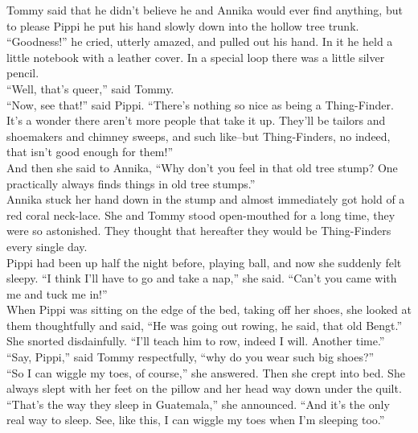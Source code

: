 \documentclass{standard}
\begin{document}
Tommy said that he didn’t believe he and Annika would ever find anything, but to please Pippi he put his hand slowly down into the hollow tree trunk.\\

``Goodness!” he cried, utterly amazed, and pulled out his hand. In it he held a little notebook with a leather cover. In a special loop there was a little silver pencil.\\

``Well, that’s queer,” said Tommy.\\

``Now, see that!” said Pippi. ``There’s nothing so nice as being a Thing-Finder. It’s a wonder there aren’t more people that take it up. They’ll be tailors and shoemakers and chimney sweeps, and such like--but Thing-Finders, no indeed, that isn’t good enough for them!”\\

And then she said to Annika, ``Why don’t you feel in that old tree stump? One practically always finds things in old tree stumps.”\\

Annika stuck her hand down in the stump and almost immediately got hold of a red coral neck-lace. She and Tommy stood open-mouthed for a long time, they were so astonished. They thought that hereafter they would be Thing-Finders every single day.\\

Pippi had been up half the night before, playing ball, and now she suddenly felt sleepy. ``I think I’ll have to go and take a nap,” she said. ``Can’t you came with me and tuck me in!”\\

When Pippi was sitting on the edge of the bed, taking off her shoes, she looked at them thoughtfully and said, ``He was going out rowing, he said, that old Bengt.” She snorted disdainfully. ``I’ll teach him to row, indeed I will. Another time.”\\

``Say, Pippi,” said Tommy respectfully, ``why do you wear such big shoes?”\\

``So I can wiggle my toes, of course,” she answered. Then she crept into bed. She always slept with her feet on the pillow and her head way down under the quilt. ``That’s the way they sleep in Guatemala,” she announced. ``And it’s the only real way to sleep. See, like this, I can wiggle my toes when I’m sleeping too.”\\
\end{document}
